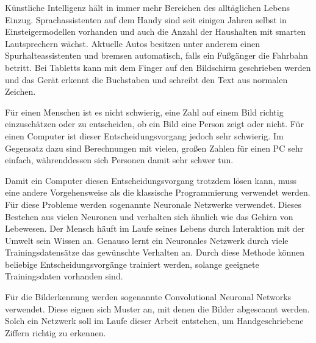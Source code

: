 \documentclass[../main.tex]{subfiles}
\begin{document}
Künstliche Intelligenz hält in immer mehr Bereichen des alltäglichen Lebens Einzug. Sprachassistenten auf dem Handy sind seit einigen Jahren selbst in Einsteigermodellen vorhanden und auch die Anzahl der Haushalten mit smarten Lautsprechern wächst. Aktuelle Autos besitzen unter anderem einen Spurhalteassistenten und bremsen automatisch, falls ein Fußgänger die Fahrbahn betritt. Bei Tabletts kann mit dem Finger auf den Bildschirm geschrieben werden und das Gerät erkennt die Buchstaben und schreibt den Text aus normalen Zeichen.

Für einen Menschen ist es nicht schwierig, eine Zahl auf einem Bild richtig einzuschätzen oder zu entscheiden, ob ein Bild eine Person zeigt oder nicht. Für einen Computer ist dieser Entscheidungsvorgang jedoch sehr schwierig.
Im Gegensatz dazu sind Berechnungen mit vielen, großen Zahlen für einen PC sehr einfach, währenddessen sich Personen damit sehr schwer tun.

Damit ein Computer diesen Entscheidungsvorgang trotzdem lösen kann, muss eine andere Vorgehensweise als die klassische Programmierung verwendet werden. Für diese Probleme werden sogenannte Neuronale Netzwerke verwendet. Dieses Bestehen aus vielen Neuronen und verhalten sich ähnlich wie das Gehirn von Lebewesen. Der Mensch häuft im Laufe seines Lebens durch Interaktion mit der Umwelt sein Wissen an. Genauso lernt ein Neuronales Netzwerk durch viele Trainingsdatensätze das gewünschte Verhalten an. Durch diese Methode können beliebige Entscheidungsvorgänge trainiert werden, solange geeignete Trainingsdaten vorhanden sind.

Für die Bilderkennung werden sogenannte {Convolutional Neuronal Networks} verwendet. Diese eignen sich Muster an, mit denen die Bilder abgescannt werden. Solch ein Netzwerk soll im Laufe dieser Arbeit entstehen, um Handgeschriebene Ziffern richtig zu erkennen.
\end{document}
